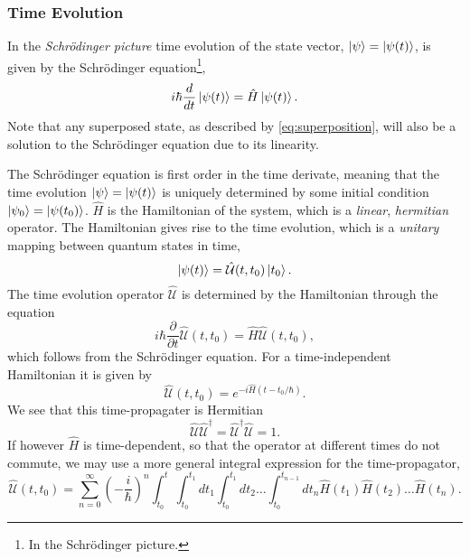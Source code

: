     \subsubsection{Time Evolution}
    In the \emph{Schrödinger picture}
    time evolution of the state vector, $\ket{\psi} = \ket{\psi (t)}$, is given by the Schrödinger
    equation\footnote{In the Schrödinger picture.},
    \begin{equation}
        i\hbar \frac{d}{dt} \ket{\psi (t)} = \hat{H} \ket{\psi (t)}.
    \end{equation}
    Note that any superposed state, as described by \ref{eq:superposition}, will also be 
    a solution to the Schrödinger equation due to its linearity.

    The Schrödinger equation is first order in the time derivate, meaning that the time 
    evolution $\ket{\psi} = \ket{\psi(t)}$ is uniquely determined by some initial 
    condition $\ket{\psi_0} = \ket{\psi(t_0)}$. $\hat{H}$ is the Hamiltonian of the system,
    which is a \emph{linear}, \emph{hermitian} operator. The Hamiltonian gives rise to the 
    time evolution, which is a \emph{unitary} mapping between quantum states in time,
    \begin{equation}
        \ket{\psi(t)} =  \hat{\mathcal{U}}(t, t_0) \ket{t_0}.
    \end{equation}
    The time evolution operator $\hat{\mathcal{U}}$ is determined by the Hamiltonian 
    through the equation 
    \begin{equation}
        i\hbar \frac{\partial}{\partial t} \hat{\mathcal{U}}(t, t_0)
            = \hat{H}\hat{\mathcal{U}}(t, t_0),
    \end{equation}
    which follows from the Schrödinger equation. For a time-independent 
    Hamiltonian it is given by 
    \begin{equation}
        \hat{\mathcal{U}}(t, t_0) = e^{-i \hat{H}(t - t_0/\hbar)}.
    \end{equation}
    We see that this time-propagater is Hermitian 
    \begin{equation}
        \hat{\mathcal{U}}\hat{\mathcal{U}}^\dagger 
        = \hat{\mathcal{U}}^\dagger \hat{\mathcal{U}} = 1.
    \end{equation}
    If however $\hat{H}$ is time-dependent, so that the operator at different times do 
    not commute, we may use a more general integral expression for the time-propagator,
    \begin{equation}
        \hat{\mathcal{U}}(t, t_0)
         = \sum_{n=0}^\infty (-\frac{i}{\hbar})^n
            \int_{t_0}^t \int_{t_0}^{t_1}dt_1 \int_{t_0}^{t_1}dt_2 \dots \int_{t_0}^{t_{n-1}}
                dt_n \hat{H}(t_1)\hat{H}(t_2) \dots \hat{H}(t_n).
    \end{equation}

